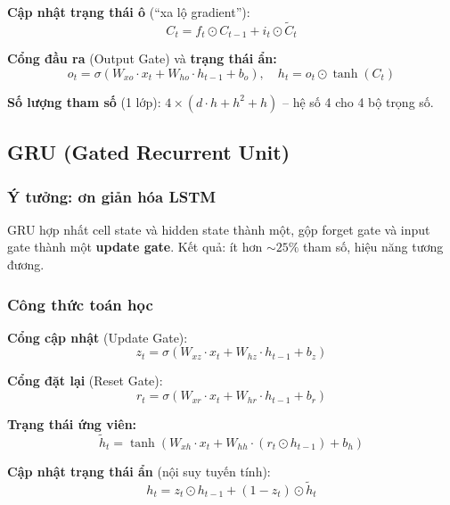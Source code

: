 \documentclass[a4paper]{article}
\theoremstyle{definition}
\begin{document}
\textbf{Cập nhật trạng thái ô} (``xa lộ gradient''):
\begin{equation}
	C_t = f_t \odot C_{t-1} + i_t \odot \tilde{C}_t
\end{equation}

\textbf{Cổng đầu ra} (Output Gate) và \textbf{trạng thái ẩn:}
\begin{equation}
	o_t = \sigma\left(W_{xo} \cdot x_t + W_{ho} \cdot h_{t-1} + b_o\right), \quad h_t = o_t \odot \tanh(C_t)
\end{equation}

\textbf{Số lượng tham số} (1 lớp): $4 \times (d \cdot h + h^2 + h)$ -- hệ số 4 cho 4 bộ trọng số.

\subsection{GRU (Gated Recurrent Unit)}

\subsubsection{Ý tưởng: \DJ ơn giản hóa LSTM}
GRU \cite{cho2014learning} hợp nhất cell state và hidden state thành một, gộp forget gate và input gate thành một \textbf{update gate}. Kết quả: ít hơn $\sim 25\%$ tham số, hiệu năng tương đương.

\subsubsection{Công thức toán học}
\textbf{Cổng cập nhật} (Update Gate):
\begin{equation}
	z_t = \sigma\left(W_{xz} \cdot x_t + W_{hz} \cdot h_{t-1} + b_z\right)
\end{equation}

\textbf{Cổng đặt lại} (Reset Gate):
\begin{equation}
	r_t = \sigma\left(W_{xr} \cdot x_t + W_{hr} \cdot h_{t-1} + b_r\right)
\end{equation}

\textbf{Trạng thái ứng viên:}
\begin{equation}
	\tilde{h}_t = \tanh\left(W_{xh} \cdot x_t + W_{hh} \cdot (r_t \odot h_{t-1}) + b_h\right)
\end{equation}

\textbf{Cập nhật trạng thái ẩn} (nội suy tuyến tính):
\begin{equation}
	h_t = z_t \odot h_{t-1} + (1 - z_t) \odot \tilde{h}_t
\end{equation}
\end{document}
